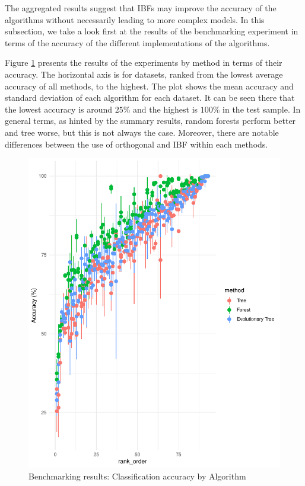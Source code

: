 \documentclass[]{elsarticle} %
\makeatletter
\def\maxwidth{\ifdim\Gin@nat@width>\linewidth\linewidth
\else\Gin@nat@width\fi}
\let\Oldincludegraphics\includegraphics
\renewcommand{\includegraphics}[1]{\Oldincludegraphics[width=\maxwidth]{#1}}
\makeatother
\begin{document}
The aggregated results suggest that IBFs may improve the accuracy of the
algorithms without necessarily leading to more complex models. In this
subsection, we take a look first at the results of the benchmarking
experiment in terms of the accuracy of the different implementations of
the algorithms.

Figure \ref{fig:fig8-performance-algorithm-results} presents the results
of the experiments by method in terms of their accuracy. The horizontal
axis is for datasets, ranked from the lowest average accuracy of all
methods, to the highest. The plot shows the mean accuracy and standard
deviation of each algorithm for each dataset. It can be seen there that
the lowest accuracy is around \(25\)\% and the highest is \(100\)\% in
the test sample. In general terms, as hinted by the summary results,
random forests perform better and tree worse, but this is not always the
case. Moreover, there are notable differences between the use of
orthogonal and IBF within each methods.

\begin{figure}
\centering
\includegraphics{Trees_with_Base_Functions_v2_files/figure-latex/fig8-performance-algorithm-results-1.pdf}
\caption{\label{fig:fig8-performance-algorithm-results}Benchmarking
results: Classification accuracy by Algorithm}
\end{figure}
\end{document}
